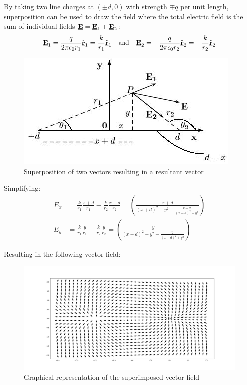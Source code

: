 \documentclass[10pt,a4paper]{article}
\begin{document}
By taking two line charges at $(\pm d,0)$ with strength $\mp q$ per unit length, superposition can be
used to draw the field where the total electric field is the sum of individual fields
$\textbf{\underline{E}} = \textbf{\underline{E}}_1 + \textbf{\underline{E}}_2$:
\begin{align*}
    \textbf{\underline{E}}_1=\frac{q}{2\pi \epsilon_0 r_1}\hat{\textbf{\underline{r}}}_1 = \frac{k}{r_1}\hat{\textbf{\underline{r}}}_1 \quad \text{and} \quad \textbf{\underline{E}}_2=-\frac{q}{2\pi \epsilon_0 r_2}\hat{\textbf{\underline{r}}}_2=-\frac{k}{r_2}\hat{\textbf{\underline{r}}}_2
\end{align*}
\begin{figure} [h!]
    \centering
    \includegraphics[scale=0.8]{Superposition.JPG}
    \caption{Superposition of two vectors resulting in a resultant vector}
\end{figure}

Simplifying:
\begin{align*}
    E_x&=\frac{k}{r_1}\frac{x+d}{r_1}-\frac{k}{r_2}\frac{x-d}{r_2} = \left(\frac{x+d}{(x+d)^2+y^2 - \frac{x-d}{(x-d)^2+y^2}}\right) \\
    E_y&=\frac{k}{r_1}\frac{y}{r_1}-\frac{k}{r_2}\frac{y}{r_2} = \left(\frac{y}{(x+d)^2+y^2 - \frac{y}{(x-d)^2+y^2}}\right)
\end{align*}

Resulting in the following vector field:
\begin{figure} [h!]
    \centering
    \includegraphics[scale=0.2]{Superposition_field.jpeg}
    \caption{Graphical representation of the superimposed vector field}
\end{figure}
\end{document}
